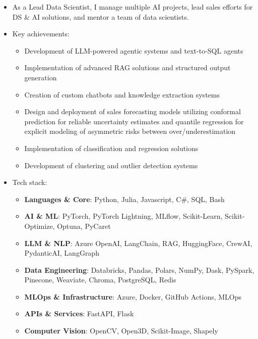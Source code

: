 
{\small
{}
\begin{itemize}
\item As a Lead Data Scientist, I manage multiple AI projects, lead sales efforts for DS \& AI solutions, and mentor a team of data scientists.
\item Key achievements:
\begin{itemize}
    \item Development of LLM-powered agentic systems and text-to-SQL agents
    \item Implementation of advanced RAG solutions and structured output generation
    \item Creation of custom chatbots and knowledge extraction systems
    \item Design and deployment of sales forecasting models utilizing conformal prediction for reliable uncertainty estimates and quantile regression for explicit modeling of asymmetric risks between over/underestimation
    \item Implementation of classification and regression solutions
    \item Development of clustering and outlier detection systems
\end{itemize}
\item Tech stack:
\begin{itemize}
    \item \textbf{Languages \& Core}: {\color{accent2}Python, Julia, Javascript, C\#, SQL, Bash}
    \item \textbf{AI \& ML}: {\color{accent2}PyTorch, PyTorch Lightning, MLflow, Scikit-Learn, Scikit-Optimize, Optuna, PyCaret}
    \item \textbf{LLM \& NLP}: {\color{accent2}Azure OpenAI, LangChain, RAG, HuggingFace, CrewAI, PydanticAI, LangGraph}
    \item \textbf{Data Engineering}: {\color{accent2}Databricks, Pandas, Polars, NumPy, Dask, PySpark, Pinecone, Weaviate, Chroma, PostgreSQL, Redis}
    \item \textbf{MLOps \& Infrastructure}: {\color{accent2}Azure, Docker, GitHub Actions, MLOps}
    \item \textbf{APIs \& Services}: {\color{accent2}FastAPI, Flask}
    \item \textbf{Computer Vision}: {\color{accent2}OpenCV, Open3D, Scikit-Image, Shapely}
\end{itemize}
\end{itemize}

}
